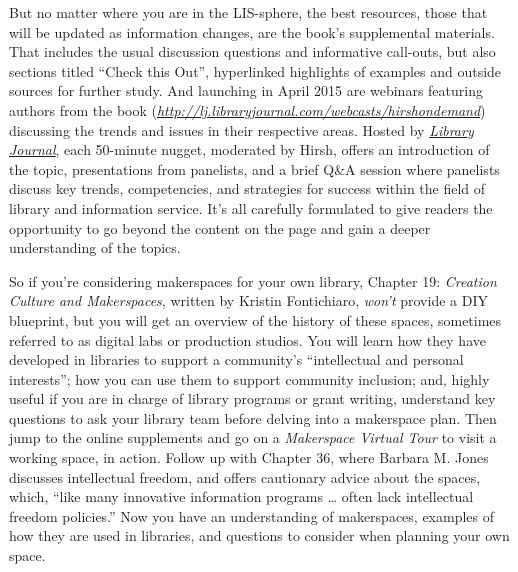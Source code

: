 \documentclass[a4paper,
fontsize=11pt,
oneside,
numbers=noperiodatend,
parskip=half-,
bibliography=totoc,
final
]{scrartcl}
\begin{document}
But no matter where you are in the LIS-sphere, the best resources, those
that will be updated as information changes, are the book's supplemental
materials. That includes the usual discussion questions and informative
call-outs, but also sections titled \enquote{Check this Out},
hyperlinked highlights of examples and outside sources for further
study. And launching in April 2015 are webinars featuring authors from
the book
(\href{http://lj.libraryjournal.com/webcasts/hirshondemand}{\emph{http://lj.libraryjournal.com/webcasts/hirshondemand}})
discussing the trends and issues in their respective areas. Hosted by
\href{http://lj.libraryjournal.com}{\emph{Library Journal}}, each
50-minute nugget, moderated by Hirsh, offers an introduction of the
topic, presentations from panelists, and a brief Q\&A session where
panelists discuss key trends, competencies, and strategies for success
within the field of library and information service. It's all carefully
formulated to give readers the opportunity to go beyond the content on
the page and gain a deeper understanding of the topics.

So if you're considering makerspaces for your own library, Chapter 19:
\emph{Creation Culture and Makerspaces}, written by Kristin Fontichiaro,
\emph{won't} provide a DIY blueprint, but you will get an overview of
the history of these spaces, sometimes referred to as digital labs or
production studios. You will learn how they have developed in libraries
to support a community's \enquote{intellectual and personal interests};
how you can use them to support community inclusion; and, highly useful
if you are in charge of library programs or grant writing, understand
key questions to ask your library team before delving into a makerspace
plan. Then jump to the online supplements and go on a \emph{Makerspace
Virtual Tour} to visit a working space, in action. Follow up with
Chapter 36, where Barbara M. Jones discusses intellectual freedom, and
offers cautionary advice about the spaces, which, \enquote{like many
innovative information programs \ldots{} often lack intellectual freedom
policies.} Now you have an understanding of makerspaces, examples of how
they are used in libraries, and questions to consider when planning your
own space.
\end{document}
